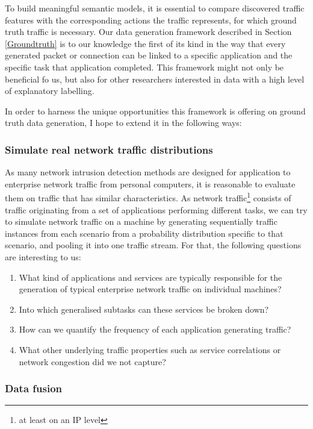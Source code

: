 \documentclass[a4paper,12pt,twoside]{report}
\begin{document}
To build meaningful semantic models, it is essential to compare discovered traffic features with the corresponding actions the traffic represents, for which ground truth traffic is necessary. Our data generation framework described in Section \ref{Groundtruth} is to our knowledge the first of its kind in the way that every generated packet or connection can be linked to a specific application and the specific task that application completed. This framework might not only be beneficial fo us, but also for other researchers interested in data with a high level of explanatory labelling.

In order to harness the unique opportunities this framework is offering on ground truth data generation, I hope to extend it in the following ways:

\subsubsection{Simulate real network traffic distributions}

As many network intrusion detection methods are designed for application to enterprise network traffic from personal computers, it is reasonable to evaluate them on traffic that has similar characteristics. As network traffic\footnote{at least on an IP level} consists of traffic originating from a set of applications performing different tasks, we can try to simulate network traffic on a machine by generating sequentially traffic instances from each scenario from a probability distribution specific to that scenario, and  pooling it into one traffic stream. For that, the following questions are interesting to us:
\begin{enumerate}
\item What kind of applications and services are typically responsible for the generation of typical enterprise network traffic on individual machines?
\item Into which generalised subtasks can these services be broken down?
\item How can we quantify the frequency of each application generating traffic?
\item What other underlying traffic properties such as service correlations or network congestion did we not capture?
\end{enumerate}

\subsubsection{Data fusion}
\end{document}
